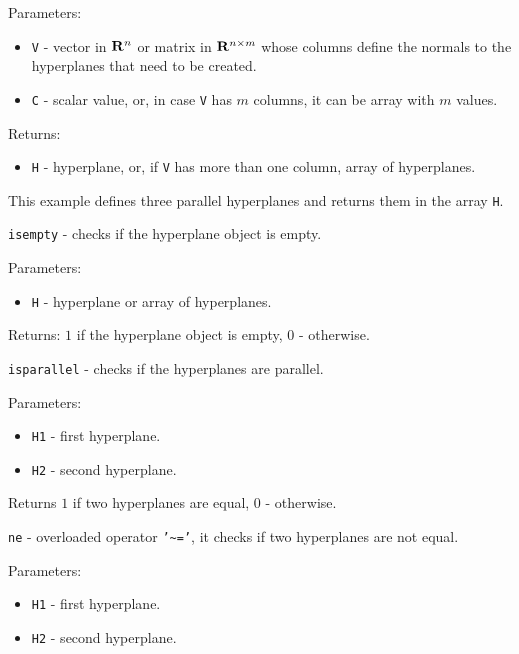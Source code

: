 \documentclass{report}
\begin{document}
Parameters:
\begin{itemize}
\item {\tt V} - vector in ${\bf R}^n$ or matrix in ${\bf R}^{n\times m}$ whose
columns define the normals to the hyperplanes that need to be created.
\item {\tt C} - scalar value, or, in case {\tt V} has $m$ columns, it can be
array with $m$ values.
\end{itemize}

Returns:
\begin{itemize}
\item {\tt H} - hyperplane, or, if {\tt V} has more than one column,
array of hyperplanes.
\end{itemize}


This example defines three parallel hyperplanes and returns them in the array {\tt H}.

\newpage

{\Large {\tt isempty}} - checks if the hyperplane object is empty.

Parameters:
\begin{itemize}
\item {\tt H} - hyperplane or array of hyperplanes.
\end{itemize}

Returns: $1$ if the hyperplane object is empty, $0$ - otherwise.

\newpage

{\Large {\tt isparallel}} - checks if the hyperplanes are parallel.

Parameters:
\begin{itemize}
\item {\tt H1} - first hyperplane.
\item {\tt H2} - second hyperplane.
\end{itemize}

Returns $1$ if two hyperplanes are equal, $0$ - otherwise.



\newpage

{\Large {\tt ne}} - overloaded operator {\tt '\~{ }='},
it checks if two hyperplanes are not equal.

Parameters:
\begin{itemize}
\item {\tt H1} - first hyperplane.
\item {\tt H2} - second hyperplane.
\end{itemize}
\end{document}
